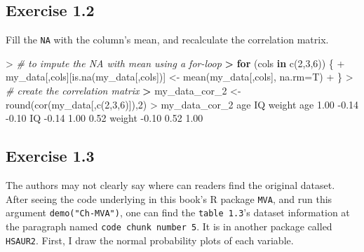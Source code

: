 \documentclass[
]{article}
\newenvironment{Shaded}{\begin{snugshade}}{\end{snugshade}}
\newcommand{\AttributeTok}[1]{\textcolor[rgb]{0.77,0.63,0.00}{#1}}
\newcommand{\CommentTok}[1]{\textcolor[rgb]{0.56,0.35,0.01}{\textit{#1}}}
\newcommand{\ControlFlowTok}[1]{\textcolor[rgb]{0.13,0.29,0.53}{\textbf{#1}}}
\newcommand{\DecValTok}[1]{\textcolor[rgb]{0.00,0.00,0.81}{#1}}
\newcommand{\ErrorTok}[1]{\textcolor[rgb]{0.64,0.00,0.00}{\textbf{#1}}}
\newcommand{\FloatTok}[1]{\textcolor[rgb]{0.00,0.00,0.81}{#1}}
\newcommand{\FunctionTok}[1]{\textcolor[rgb]{0.00,0.00,0.00}{#1}}
\newcommand{\NormalTok}[1]{#1}
\newcommand{\OtherTok}[1]{\textcolor[rgb]{0.56,0.35,0.01}{#1}}
\newcommand{\SpecialCharTok}[1]{\textcolor[rgb]{0.00,0.00,0.00}{#1}}
\begin{document}
\hypertarget{exercise-1.2}{%
\subsection{Exercise 1.2}\label{exercise-1.2}}

Fill the \texttt{NA} with the column's mean, and recalculate the
correlation matrix.

\begin{Shaded}
\begin{Highlighting}[]
\SpecialCharTok{\textgreater{}} \CommentTok{\# to impute the NA with mean using a for{-}loop}
\ErrorTok{\textgreater{}} \ControlFlowTok{for}\NormalTok{ (cols }\ControlFlowTok{in} \FunctionTok{c}\NormalTok{(}\DecValTok{2}\NormalTok{,}\DecValTok{3}\NormalTok{,}\DecValTok{6}\NormalTok{)) \{}
\SpecialCharTok{+}\NormalTok{   my\_data[,cols][}\FunctionTok{is.na}\NormalTok{(my\_data[,cols])] }\OtherTok{\textless{}{-}} \FunctionTok{mean}\NormalTok{(my\_data[,cols], }\AttributeTok{na.rm=}\NormalTok{T)}
\SpecialCharTok{+}\NormalTok{ \}}
\SpecialCharTok{\textgreater{}} \CommentTok{\# create the correlation matrix}
\ErrorTok{\textgreater{}}\NormalTok{ my\_data\_cor\_2 }\OtherTok{\textless{}{-}} \FunctionTok{round}\NormalTok{(}\FunctionTok{cor}\NormalTok{(my\_data[,}\FunctionTok{c}\NormalTok{(}\DecValTok{2}\NormalTok{,}\DecValTok{3}\NormalTok{,}\DecValTok{6}\NormalTok{)]),}\DecValTok{2}\NormalTok{)}
\SpecialCharTok{\textgreater{}}\NormalTok{ my\_data\_cor\_2 }
\NormalTok{         age    IQ weight}
\NormalTok{age     }\FloatTok{1.00} \SpecialCharTok{{-}}\FloatTok{0.14}  \SpecialCharTok{{-}}\FloatTok{0.10}
\NormalTok{IQ     }\SpecialCharTok{{-}}\FloatTok{0.14}  \FloatTok{1.00}   \FloatTok{0.52}
\NormalTok{weight }\SpecialCharTok{{-}}\FloatTok{0.10}  \FloatTok{0.52}   \FloatTok{1.00}
\end{Highlighting}
\end{Shaded}

\hypertarget{exercise-1.3}{%
\subsection{Exercise 1.3}\label{exercise-1.3}}

The authors may not clearly say where can readers find the original
dataset. After seeing the code underlying in this book's R package
\texttt{MVA}, and run this argument \texttt{demo("Ch-MVA")}, one can
find the \texttt{table\ 1.3}'s dataset information at the paragraph
named \texttt{code\ chunk\ number\ 5}. It is in another package called
\texttt{HSAUR2}. First, I draw the normal probability plots of each
variable.
\end{document}
